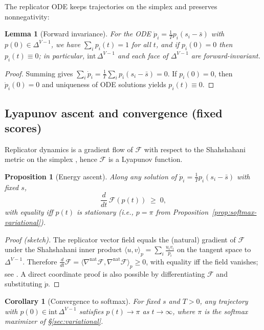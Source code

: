 \documentclass[11pt,reqno]{article}
\numberwithin{equation}{section}
\theoremstyle{plain}
\newtheorem{proposition}[theorem]{Proposition}
\newtheorem{lemma}[theorem]{Lemma}
\newtheorem{corollary}[theorem]{Corollary}
\theoremstyle{definition}
\theoremstyle{remark}
\newcommand{\1}{\mathbbm{1}}
\newcommand{\simplex}{\Delta^{V-1}}
\newcommand{\avgscore}{\bar{s}}
\begin{document}
The replicator ODE keeps trajectories on the simplex and preserves nonnegativity:

\begin{lemma}[Forward invariance]\label{lem:forward-invariance}
For the ODE $\dot p_i=\tfrac{1}{T}p_i(s_i-\avgscore)$ with $p(0)\in\simplex$, we have $\sum_i p_i(t)=1$ for all $t$, and if $p_i(0)=0$ then $p_i(t)\equiv 0$; in particular, $\mathrm{int}\,\simplex$ and each face of $\simplex$ are forward-invariant.
\end{lemma}

\begin{proof}
Summing gives $\sum_i \dot p_i = \tfrac{1}{T}\sum_i p_i(s_i-\avgscore)=0$. If $p_i(0)=0$, then $\dot p_i(0)=0$ and uniqueness of ODE solutions yields $p_i(t)\equiv 0$.
\end{proof}

\subsection{Lyapunov ascent and convergence (fixed scores)}
Replicator dynamics is a gradient flow of $\mathcal{F}$ with respect to the Shahshahani metric on the simplex \citep{shahshahani1979nouvelle,hofbauer1998evolutionary}, hence $\mathcal{F}$ is a Lyapunov function.

\begin{proposition}[Energy ascent]\label{prop:lyapunov}
Along any solution of $\dot p_i=\tfrac{1}{T}p_i(s_i-\avgscore)$ with fixed $s$,
\[
\frac{d}{dt}\,\mathcal{F}(p(t)) \;\ge\; 0,
\]
with equality iff $p(t)$ is stationary (i.e., $p=\pi$ from Proposition~\ref{prop:softmax-variational}).
\end{proposition}

\begin{proof}[Proof (sketch)]
The replicator vector field equals the (natural) gradient of $\mathcal{F}$ under the Shahshahani inner product
$\langle u,v\rangle_p=\sum_i \tfrac{u_i v_i}{p_i}$ on the tangent space to $\simplex$. Therefore
$\tfrac{d}{dt}\mathcal{F}=\langle \nabla^{\text{nat}}\mathcal{F},\nabla^{\text{nat}}\mathcal{F}\rangle_p\ge 0$,
with equality iff the field vanishes; see \citet{shahshahani1979nouvelle,hofbauer1998evolutionary}.
A direct coordinate proof is also possible by differentiating $\mathcal{F}$ and substituting $\dot p$.
\end{proof}

\begin{corollary}[Convergence to softmax]\label{cor:convergence}
For fixed $s$ and $T>0$, any trajectory with $p(0)\in\mathrm{int}\,\simplex$ satisfies $p(t)\to \pi$ as $t\to\infty$, where $\pi$ is the softmax maximizer of \S\ref{sec:variational}.
\end{corollary}
\end{document}
